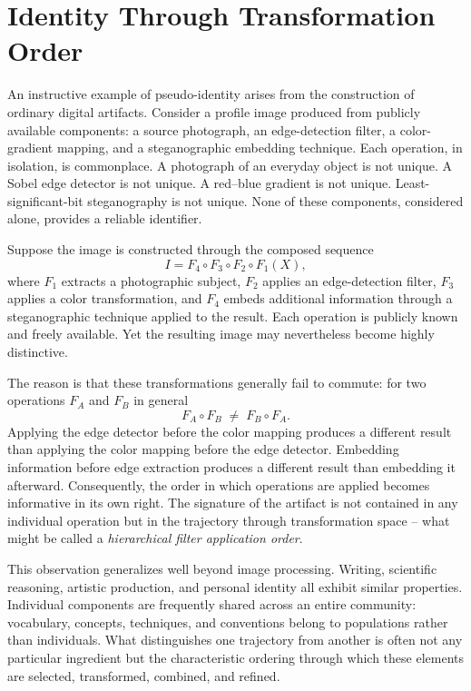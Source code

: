 \documentclass[11pt]{article}
\theoremstyle{plain}
\begin{document}
\section{Identity Through Transformation Order}

An instructive example of pseudo-identity arises from the construction of ordinary digital artifacts. Consider a profile image produced from publicly available components: a source photograph, an edge-detection filter, a color-gradient mapping, and a steganographic embedding technique. Each operation, in isolation, is commonplace. A photograph of an everyday object is not unique. A Sobel edge detector is not unique. A red--blue gradient is not unique. Least-significant-bit steganography is not unique. None of these components, considered alone, provides a reliable identifier.

Suppose the image is constructed through the composed sequence
\[
I = F_4 \circ F_3 \circ F_2 \circ F_1(X),
\]
where $F_1$ extracts a photographic subject, $F_2$ applies an edge-detection filter, $F_3$ applies a color transformation, and $F_4$ embeds additional information through a steganographic technique applied to the result. Each operation is publicly known and freely available. Yet the resulting image may nevertheless become highly distinctive.

The reason is that these transformations generally fail to commute: for two operations $F_A$ and $F_B$ in general
\[
F_A \circ F_B \;\neq\; F_B \circ F_A.
\]
Applying the edge detector before the color mapping produces a different result than applying the color mapping before the edge detector. Embedding information before edge extraction produces a different result than embedding it afterward. Consequently, the order in which operations are applied becomes informative in its own right. The signature of the artifact is not contained in any individual operation but in the trajectory through transformation space -- what might be called a \emph{hierarchical filter application order}.

This observation generalizes well beyond image processing. Writing, scientific reasoning, artistic production, and personal identity all exhibit similar properties. Individual components are frequently shared across an entire community: vocabulary, concepts, techniques, and conventions belong to populations rather than individuals. What distinguishes one trajectory from another is often not any particular ingredient but the characteristic ordering through which these elements are selected, transformed, combined, and refined.
\end{document}
